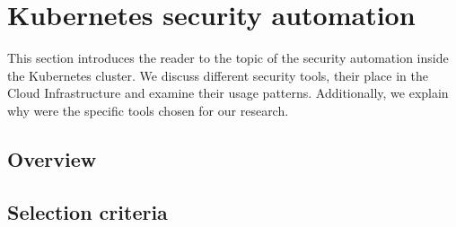 \section{Kubernetes security automation}
\label{sec:kubernetes-security-automation}

This section introduces the reader to the topic of the security automation inside the Kubernetes cluster. We discuss different security tools, their place in the Cloud Infrastructure and examine their usage patterns. Additionally, we explain why were the specific tools chosen for our research.

\subsection{Overview}

\subsection{Selection criteria}

